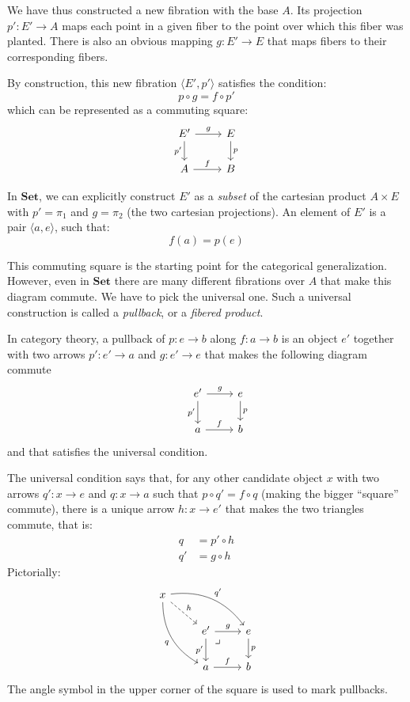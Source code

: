 \documentclass[DaoFP]{subfiles}
\begin{document}
We have thus constructed a new fibration with the base $A$. Its projection $p' \colon E' \to A$ maps each point in a given fiber to the point over which this fiber was planted. There is also an obvious mapping $g \colon E' \to E$ that maps fibers to their corresponding fibers. 

By construction, this new fibration $\langle E', p'\rangle$ satisfies the condition:
\[ p \circ g = f \circ p' \]
which can be represented as a commuting square:
\[
 \begin{tikzcd}
 E'
 \arrow[d, "p'"']
 \arrow[r, "g"]
 & E
 \arrow[d, "p"]
 \\
 A
 \arrow[r, "f"]
 &B
  \end{tikzcd}
\]

In  $\mathbf{Set}$, we can explicitly construct $E'$ as a \emph{subset} of the cartesian product $A \times E$ with $p' = \pi_1$ and $g = \pi_2$ (the two cartesian projections). An element of $E'$ is a pair $\langle a, e \rangle$, such that:
\[ f (a) = p (e) \]

This commuting square is the starting point for the categorical generalization. However, even in $\mathbf{Set}$ there are many different fibrations over $A$ that make this diagram commute. We have to pick the universal one. Such a universal construction is called a \emph{pullback}, or a \emph{fibered product}.

In category theory, a pullback of $p \colon e \to b$ along $f \colon a \to b$ is an object $e'$ together with two arrows $p' \colon e' \to a$ and $g \colon e' \to e$ that makes the following diagram commute\[
 \begin{tikzcd}
 &e'
 \arrow[r, "g"]
 \arrow[d, "p'"']
 &e
 \arrow[d, "p"]
 \\
 &a
 \arrow[r, "f"]
 &b
  \end{tikzcd}
\]
and that satisfies the universal condition. 


The universal condition says that, for any other candidate object $x$ with two arrows $q' \colon x \to e$ and $q \colon x \to a$ such that $p \circ q' = f \circ q$ (making the bigger ``square'' commute), there is a unique arrow $h \colon x \to e'$ that makes the two triangles commute, that is:
\begin{align*}
q &= p' \circ h \\
q' &= g \circ h
\end{align*}
Pictorially:
\[
 \begin{tikzcd}
 x
 \arrow[dr, dashed, "h"]
 \arrow[drr, bend left, "q'"]
 \arrow[ddr, bend right, "q"']
 \\
 &e'
 \arrow[r, "g"]
 \arrow[d, "p'"']
\arrow[dr, phantom,  , very near start, "\lrcorner"]
 &e
 \arrow[d, "p"]
 \\
 &a
 \arrow[r, "f"]
 &b
  \end{tikzcd}
\]
The angle symbol in the upper corner of the square is used to mark pullbacks.
\end{document}
